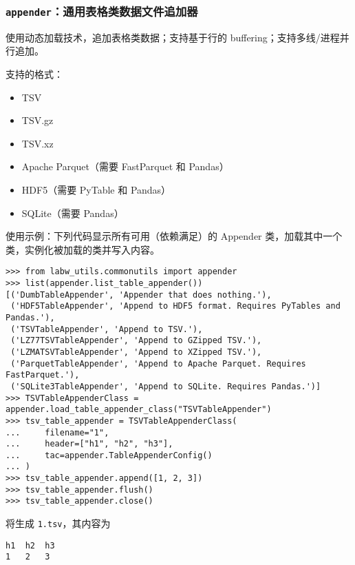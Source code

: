\documentclass[pdf,9pt]{beamer}
\begin{document}
    \subsubsection{\texttt{appender}：通用表格类数据文件追加器}

    \begin{frame}{\subsubsecname}
        使用动态加载技术，追加表格类数据；支持基于行的 buffering；支持多线/进程并行追加。

        支持的格式：

        \begin{itemize}
            \item TSV
            \item TSV.gz
            \item TSV.xz
            \item Apache Parquet（需要 FastParquet 和 Pandas）
            \item HDF5（需要 PyTable 和 Pandas）
            \item SQLite（需要 Pandas）
        \end{itemize}
    \end{frame}

    \begin{frame}[fragile]{\subsubsecname}

        使用示例：下列代码显示所有可用（依赖满足）的 Appender 类，加载其中一个类，实例化被加载的类并写入内容。
        \begin{verbatim}
>>> from labw_utils.commonutils import appender
>>> list(appender.list_table_appender())
[('DumbTableAppender', 'Appender that does nothing.'),
 ('HDF5TableAppender', 'Append to HDF5 format. Requires PyTables and Pandas.'),
 ('TSVTableAppender', 'Append to TSV.'),
 ('LZ77TSVTableAppender', 'Append to GZipped TSV.'),
 ('LZMATSVTableAppender', 'Append to XZipped TSV.'),
 ('ParquetTableAppender', 'Append to Apache Parquet. Requires FastParquet.'),
 ('SQLite3TableAppender', 'Append to SQLite. Requires Pandas.')]
>>> TSVTableAppenderClass = appender.load_table_appender_class("TSVTableAppender")
>>> tsv_table_appender = TSVTableAppenderClass(
...     filename="1",
...     header=["h1", "h2", "h3"],
...     tac=appender.TableAppenderConfig()
... )
>>> tsv_table_appender.append([1, 2, 3])
>>> tsv_table_appender.flush()
>>> tsv_table_appender.close()
        \end{verbatim}

        将生成 \Verb|1.tsv|，其内容为

        \begin{Verbatim}
h1  h2  h3
1   2   3
        \end{Verbatim}
    \end{frame}
\end{document}
